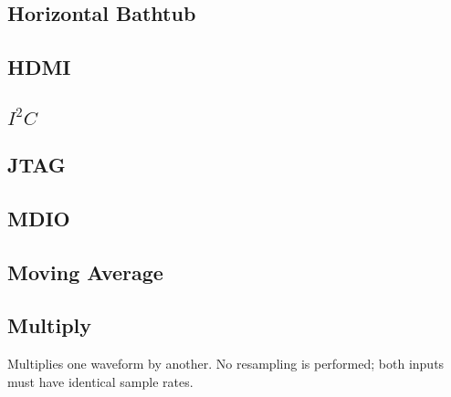 \pagebreak
\subsection{Horizontal Bathtub}

\pagebreak
\subsection{HDMI}
\label{filter:hdmi}

\pagebreak
\subsection{$I^2C$}

\pagebreak
\subsection{JTAG}

\pagebreak
\subsection{MDIO}

\pagebreak
\subsection{Moving Average}

\pagebreak
\subsection{Multiply}

Multiplies one waveform by another. No resampling is performed; both inputs must have identical sample rates.

